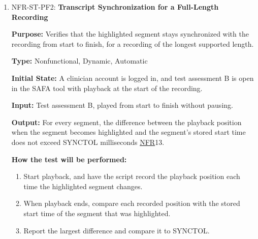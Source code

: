 \documentclass[12pt, titlepage]{article}
\newcommand{\srsnfr}[1]{\href{https://github.com/Nour-Fawaz/MacaBoca/blob/main/pdfs/SRS/SRS.pdf}{NFR}}
\renewcommand{\_}{\oldunderscore\allowbreak}
\begin{document}
\begin{enumerate}
  \item NFR-ST-PF2: \textbf{Transcript Synchronization for a Full-Length Recording\\}
  \begin{mdframed}[linewidth=0.5mm]
      \textbf{Purpose:} Verifies that the highlighted segment stays synchronized with the recording from start to finish, for a recording of the longest supported length. \par
      \textbf{Type:} Nonfunctional, Dynamic, Automatic \par
      \textbf{Initial State:} A clinician account is logged in, and test assessment B is open in the SAFA tool with playback at the start of the recording. \par
      \textbf{Input:} Test assessment B, played from start to finish without pausing. \par
      \textbf{Output:} For every segment, the difference between the playback position when the segment becomes highlighted and the segment's stored start time does not exceed SYNC\_TOL milliseconds \srsnfr*{13}. \par
      \textbf{How the test will be performed:}
      \begin{enumerate}
        \item[1.] Start playback, and have the script record the playback position each time the highlighted segment changes.
        \item[2.] When playback ends, compare each recorded position with the stored start time of the segment that was highlighted.
        \item[3.] Report the largest difference and compare it to SYNC\_TOL.
      \end{enumerate}
  \end{mdframed}


\end{enumerate}
\end{document}
